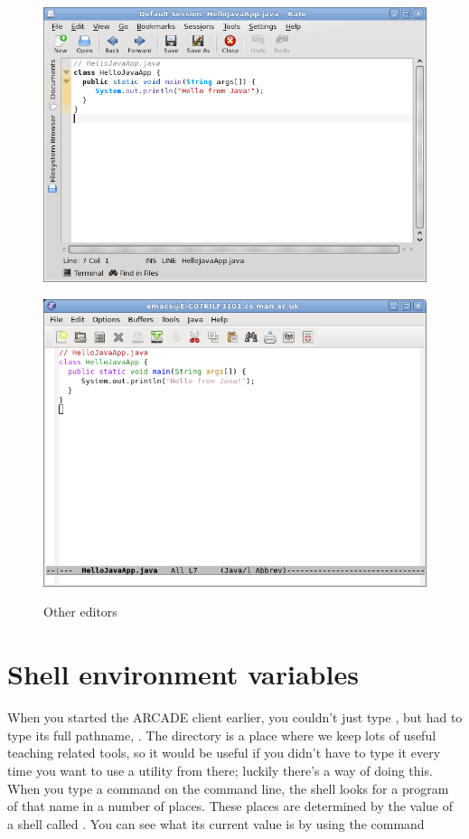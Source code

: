 \begin{figure}
  \begin{minipage}[b]{.5\linewidth}
    \centering
    \includegraphics[width=.8\textwidth]{images/kate}  
    \label{subfig:kate}
  \end{minipage}%
  \begin{minipage}[b]{.5\linewidth}
    \centering
    \includegraphics[width=.8\textwidth]{images/emacs}
    \label{subfig:emacs}
  \end{minipage}%
  \caption{Other editors}  \label{fig:texteditors}
  
\end{figure}

\section{Shell environment variables}

When you started the  ARCADE client earlier, you couldn't just type , but had to type its full pathname, . The directory  is a place where we keep lots of useful teaching related tools, so it would be useful if you didn't have to type it every time you want to use a utility from there; luckily there's a way of doing this. When you type a command on the command line, the shell looks for a program of that name in a number of places. These places are determined by the value of a shell  called . You can see what its current value is by using the command

